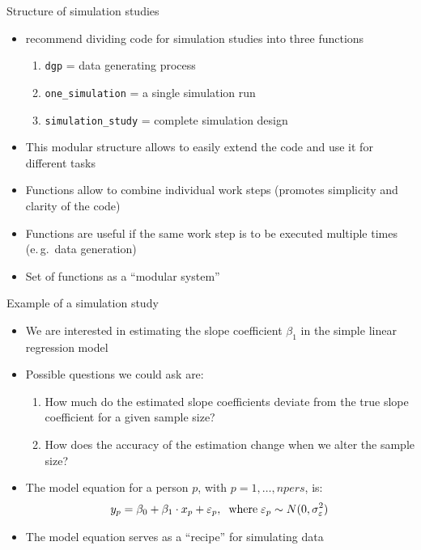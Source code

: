 \documentclass[aspectratio=169]{beamer}
\begin{document}
\begin{frame}{Structure of simulation studies}
  \begin{itemize}
    \item \citet{Strobl2024} recommend dividing code for simulation studies into
      three functions
      \begin{enumerate}
        \item \texttt{dgp} = data generating process
        \item \texttt{one\_simulation} = a single simulation run
        \item \texttt{simulation\_study} = complete simulation design
      \end{enumerate}
    \item This modular structure allows to easily extend the code and use it
      for different tasks
    \item Functions allow to combine individual work steps (promotes simplicity
      and clarity of the code)
    \item Functions are useful if the same work step is to be executed multiple
      times (e.\,g.\ data generation)
    \item Set of functions as a ``modular system''

  \end{itemize}
  \vfill
\end{frame}

\begin{frame}{Example of a simulation study}
  \begin{itemize}
    \item We are interested in estimating the slope coefficient $\beta_1$ in the
    simple linear regression model
  \item Possible questions we could ask are:
    \begin{enumerate}
      \item How much do the estimated slope coefficients deviate from the true
        slope coefficient for a given sample size?
      \item How does the accuracy of the estimation change when we alter the
        sample size?
    \end{enumerate}
    \item The model equation for a person $p$, with $p = 1,\dots, npers$, is:
      \[
        y_p = \beta_0 + \beta_1 \cdot x_p + \varepsilon_p, \hspace{0.2cm}
        \text{where} \hspace{0.1cm} \varepsilon_p \sim N(0, \sigma_{\varepsilon}^2)
      \]
    \item The model equation serves as a ``recipe'' for simulating data
  \end{itemize}
\end{frame}
\end{document}
